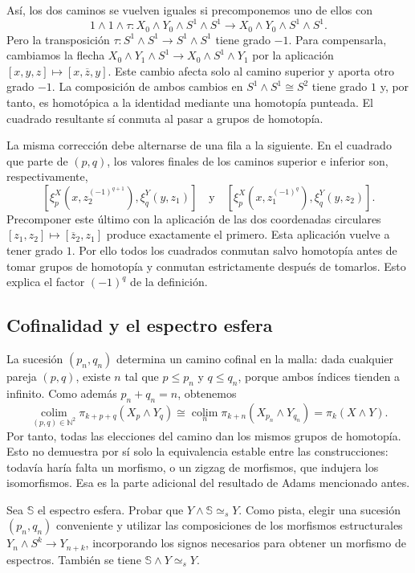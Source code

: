 Así, los dos caminos se vuelven iguales si precomponemos uno de ellos con
\[
1\wedge1\wedge\tau\colon
X_0\wedge Y_0\wedge S^1\wedge S^1
\longrightarrow X_0\wedge Y_0\wedge S^1\wedge S^1.
\]
Pero la transposición $\tau\colon S^1\wedge S^1\to S^1\wedge S^1$ tiene grado $-1$. Para compensarla, cambiamos la flecha $X_0\wedge Y_1\wedge S^1\to X_0\wedge S^1\wedge Y_1$ por la aplicación $[x,y,z]\mapsto[x,\overline z,y]$. Este cambio afecta solo al camino superior y aporta otro grado $-1$. La composición de ambos cambios en $S^1\wedge S^1\cong S^2$ tiene grado $1$ y, por tanto, es homotópica a la identidad mediante una homotopía punteada. El cuadrado resultante sí conmuta al pasar a grupos de homotopía.

La misma corrección debe alternarse de una fila a la siguiente. En el cuadrado que parte de $(p,q)$, los valores finales de los caminos superior e inferior son, respectivamente,
\[
[\xi^X_p(x,z_2^{(-1)^{q+1}}),\xi^Y_q(y,z_1)]
\quad\text{y}\quad
[\xi^X_p(x,z_1^{(-1)^q}),\xi^Y_q(y,z_2)].
\] Precomponer este último con la aplicación de las dos coordenadas circulares $[z_1,z_2]\mapsto[\overline z_2,z_1]$ produce exactamente el primero. Esta aplicación vuelve a tener grado $1$. Por ello todos los cuadrados conmutan salvo homotopía antes de tomar grupos de homotopía y conmutan estrictamente después de tomarlos. Esto explica el factor $(-1)^q$ de la definición.

\subsection{Cofinalidad y el espectro esfera}

La sucesión $(p_n,q_n)$ determina un camino cofinal en la malla: dada cualquier pareja $(p,q)$, existe $n$ tal que $p\le p_n$ y $q\le q_n$, porque ambos índices tienden a infinito. Como además $p_n+q_n=n$, obtenemos
\[
\operatorname*{colim}_{(p,q)\in\mathbb N^2}
\pi_{k+p+q}(X_p\wedge Y_q)
\cong \operatorname*{colim}_n\pi_{k+n}(X_{p_n}\wedge Y_{q_n})
=\pi_k(X\wedge Y).
\]
Por tanto, todas las elecciones del camino dan los mismos grupos de homotopía. Esto no demuestra por sí solo la equivalencia estable entre las construcciones: todavía haría falta un morfismo, o un zigzag de morfismos, que indujera los isomorfismos. Esa es la parte adicional del resultado de Adams mencionado antes.

\begin{ejer}\label{ejer:c10-unidad-smash}
Sea $\mathbb S$ el espectro esfera. Probar que $Y\wedge\mathbb S\simeq_s Y$. Como pista, elegir una sucesión $(p_n,q_n)$ conveniente y utilizar las composiciones de los morfismos estructurales $Y_n\wedge S^k\to Y_{n+k}$, incorporando los signos necesarios para obtener un morfismo de espectros. También se tiene $\mathbb S\wedge Y\simeq_s Y$.
\end{ejer}

